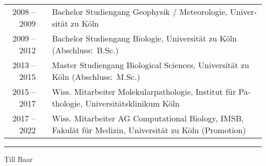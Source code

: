 \begin{otherlanguage}{german}
\noindent\begin{tabularx}{\textwidth}{rcX}
2008 -- 2009 & & Bachelor Studiengang Geophysik / Meteorologie, Universität zu
                 Köln \\
2009 -- 2012 & & Bachelor Studiengang Biologie, Universität zu Köln
                 \hfill (Abschluss:~B.Sc.) \\
2013 -- 2015 & & Master Studiengang Biological Sciences, Universität zu Köln
                 \hfill (Abschluss:~M.Sc.) \\
2015 -- 2017 & & Wiss. Mitarbeiter Molekularpathologie, Institut für
                 Pathologie, Universitätsklinikum Köln \\
2017 -- 2022 & & Wiss. Mitarbeiter AG Computational Biology, IMSB, Fakulät für
                 Medizin, Universität zu Köln \hfill (Promotion) \\
\end{tabularx}


\vfill
\hrule
\vspace{\dp\strutbox}

Till Baar

\end{otherlanguage}
